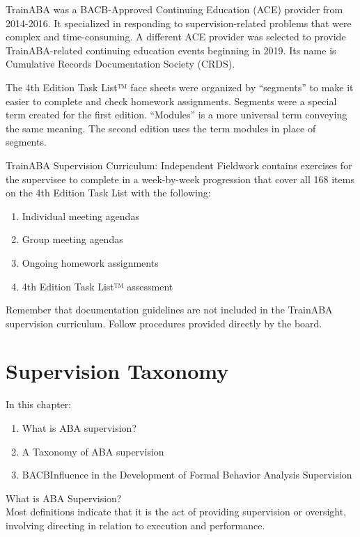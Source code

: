 TrainABA was a BACB\textregistered-Approved Continuing Education (ACE) provider from 2014-2016. It specialized in responding to supervision-related problems that were complex and time-consuming. A different ACE provider was selected to provide TrainABA-related continuing education events beginning in 2019. Its name is Cumulative Records Documentation Society (CRDS). 

The 4th Edition Task List™ face sheets were organized by ``segments'' to make it easier to complete and check homework assignments. Segments were a special term created for the first edition. ``Modules'' is a more universal term conveying the same meaning. The second edition uses the term modules in place of segments. 

TrainABA Supervision Curriculum: Independent Fieldwork contains exercises for the supervisee to complete in a week-by-week progression that cover all 168 items on the 4th Edition Task List with the following:
\begin{enumerate}
\item Individual meeting agendas
\item Group meeting agendas
\item Ongoing homework assignments
\item 4th Edition Task List™ assessment
\end{enumerate}

Remember that documentation guidelines are not included in the TrainABA supervision curriculum. Follow procedures provided directly by the board.
 
\chapter{Supervision Taxonomy}
%
In this chapter:
\begin{enumerate}
\item What is ABA supervision?
\item  A Taxonomy of ABA supervision
\item  BACB\textregistered Influence in the Development of Formal Behavior Analysis Supervision
\end{enumerate}

What is ABA Supervision?\\
Most definitions indicate that it is the act of providing supervision or oversight, involving directing in relation to execution and performance.

